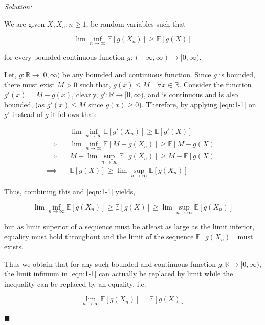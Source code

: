 \documentclass[12pt]{article}
\newcommand{\R}{\mathbb{R}}
\newcommand{\E}{\mathbb{E}}
\theoremstyle{definition}
\newenvironment{answer}{\textit{Solution: }\quad }{ \hfill $\blacksquare$}
\numberwithin{equation}{section}
\begin{document}
\begin{answer}
    
    We are given $X,X_n,n\geq 1$, be random variables such that 

    \begin{equation}
        \lim\inf_{n\rightarrow\infty}\E\left[g(X_n)\right] \geq \E\left[g(X)\right]
        \label{eqn:1-1}
    \end{equation}
    
    for every bounded continuous function $g:(-\infty,\infty)\rightarrow[0,\infty)$. 
    
    Let, $g : \R \rightarrow [0, \infty)$ be any bounded and continuous function. Since $g$ is bounded, there must exist $M > 0$ such that, $g(x) \leq M \quad \forall x \in \R$. Consider the function $g'(x) = M - g(x)$, clearly, $g': \R \rightarrow [0, \infty)$, and is continuous and is also bounded, (as $g'(x) \leq M$ since $g(x) \geq 0$). Therefore, by applying \cref{eqn:1-1} on $g'$ instead of $g$ it follows that:

    \begin{align*}
        & \lim \inf_{n \rightarrow \infty} \E\left[ g'(X_n) \right] \geq \E\left[ g'(X) \right]\\
        \implies \quad & \lim\inf_{n \rightarrow \infty} \E\left[ M - g(X_n) \right] \geq \E\left[ M - g(X) \right]\\
        \implies \quad & M - \lim\sup_{n \rightarrow \infty} \E\left[ g(X_n)\right] \geq M - \E\left[ g(X) \right] \\
        \implies \quad & \E\left[ g(X) \right] \geq \lim\sup_{n \rightarrow \infty} \E\left[ g(X_n)\right]
    \end{align*}

    Thus, combining this and \cref{eqn:1-1} yields,

    $$
    \lim\inf_{n \rightarrow \infty}\E\left[g(X_n) \right] \geq \E\left[g(X)\right] \geq \lim\sup_{n \rightarrow \infty} \E\left[ g(X_n) \right]
    $$

    but as limit superior of a sequence must be atleast as large as the limit inferior, equality must hold throughout and the limit of the sequence $\E\left[g(X_n)\right]$ must exists.


    Thus we obtain that for any such bounded and continuous function $g : \R \rightarrow [0, \infty)$, the limit infimum in \cref{eqn:1-1} can actually be replaced by limit while the inequality can be replaced by an equality, i.e.

    \begin{equation}
        \lim_{n \rightarrow \infty} \E\left[ g(X_n) \right] = \E\left[g(X)\right]
        \label{eqn:1-2}
    \end{equation}


\end{answer}
\end{document}
